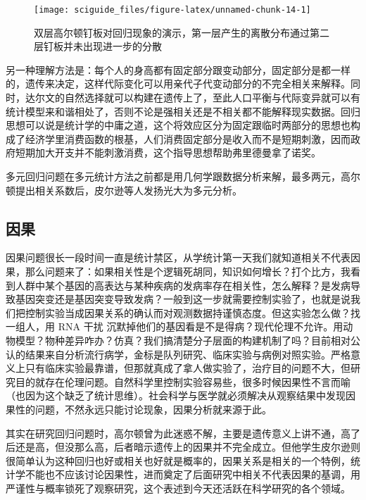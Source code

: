 \documentclass[]{tufte-book}
\begin{document}
\begin{figure}
\texttt{[image: sciguide\_files/figure-latex/unnamed-chunk-14-1]} \caption[双层高尔顿钉板对回归现象的演示，第一层产生的离散分布通过第二层钉板并未出现进一步的分散]{双层高尔顿钉板对回归现象的演示，第一层产生的离散分布通过第二层钉板并未出现进一步的分散}\label{fig:unnamed-chunk-14}
\end{figure}

另一种理解方法是：每个人的身高都有固定部分跟变动部分，固定部分是都一样的，遗传来决定，这样代际变化可以用亲代子代变动部分的不完全相关来解释。同时，达尔文的自然选择就可以构建在遗传上了，至此人口平衡与代际变异就可以有统计模型来和谐相处了，否则不论是强相关还是不相关都不能解释现实数据。回归思想可以说是统计学的中庸之道，这个将效应区分为固定跟临时两部分的思想也构成了经济学里消费函数的根基，人们消费固定部分是收入而不是短期刺激，因而政府短期加大开支并不能刺激消费，这个指导思想帮助弗里德曼拿了诺奖。

多元回归问题在多元统计方法之前都是用几何学跟数据分析来解，最多两元，高尔顿提出相关系数后，皮尔逊等人发扬光大为多元分析。

\hypertarget{ux56e0ux679c}{%
\subsection{因果}\label{ux56e0ux679c}}

因果问题很长一段时间一直是统计禁区，从学统计第一天我们就知道相关不代表因果，那么问题来了：如果相关性是个逻辑死胡同，知识如何增长？打个比方，我看到人群中某个基因的高表达与某种疾病的发病率存在相关性，怎么解释？是发病导致基因突变还是基因突变导致发病？一般到这一步就需要控制实验了，也就是说我们把控制实验当成因果关系的确认而对观测数据持谨慎态度。但这实验怎么做？找一组人，用 RNA 干扰 沉默掉他们的基因看是不是得病？现代伦理不允许。用动物模型？物种差异咋办？仿真？我们搞清楚分子层面的构建机制了吗？目前相对公认的结果来自分析流行病学，金标是队列研究、临床实验与病例对照实验。严格意义上只有临床实验最靠谱，但那就真成了拿人做实验了，治疗目的问题不大，但研究目的就存在伦理问题。自然科学里控制实验容易些，很多时候因果性不言而喻（也因为这个缺乏了统计思维）。社会科学与医学就必须解决从观察结果中发现因果性的问题，不然永远只能讨论现象，因果分析就来源于此。

其实在研究回归问题时，高尔顿曾为此迷惑不解，主要是遗传意义上讲不通，高了后还是高，但没那么高，后者暗示遗传上的因果并不完全成立。但他学生皮尔逊则很简单认为这种回归也好或相关也好就是概率的，因果关系是相关的一个特例，统计学不能也不应该讨论因果性，进而奠定了后面研究中相关不代表因果的基调，用严谨性与概率锁死了观察研究，这个表述到今天还活跃在科学研究的各个领域。
\end{document}
